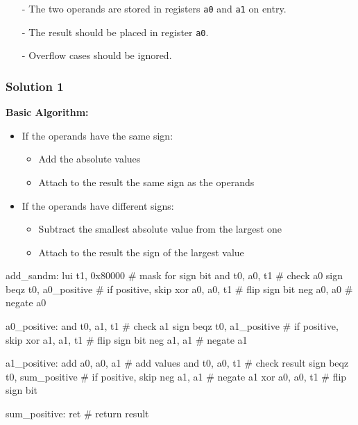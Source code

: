 \begin{itemize}
    \item[-] The two operands are stored in registers \texttt{a0} and \texttt{a1} on entry.
    \item[-] The result should be placed in register \texttt{a0}.
    \item[-] Overflow cases should be ignored.
\end{itemize}

\subsubsection{Solution 1}

\textbf{Basic Algorithm:}
\begin{itemize}
    \item If the operands have the same sign:
    \begin{itemize}
        \item Add the absolute values
        \item Attach to the result the same sign as the operands
    \end{itemize}
    \item If the operands have different signs:
    \begin{itemize}
        \item Subtract the smallest absolute value from the largest one
        \item Attach to the result the sign of the largest value
    \end{itemize}
\end{itemize}

\begin{assembly}
add_sandm:
    lui     t1, 0x80000         # mask for sign bit
    and     t0, a0, t1          # check a0 sign
    beqz    t0, a0_positive     # if positive, skip
    xor     a0, a0, t1          # flip sign bit
    neg     a0, a0              # negate a0

a0_positive:
    and     t0, a1, t1          # check a1 sign
    beqz    t0, a1_positive     # if positive, skip
    xor     a1, a1, t1          # flip sign bit
    neg     a1, a1              # negate a1

a1_positive:
    add     a0, a0, a1          # add values
    and     t0, a0, t1          # check result sign
    beqz    t0, sum_positive    # if positive, skip
    neg     a1, a1              # negate a1
    xor     a0, a0, t1          # flip sign bit

sum_positive:
    ret                         # return result
\end{assembly}
\newpage
